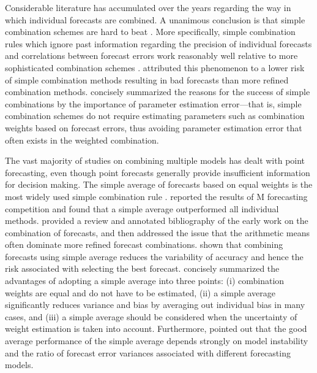 \documentclass[11pt]{article}
\begin{document}
Considerable literature has accumulated over the years regarding the way in which individual forecasts are combined. A unanimous conclusion is that simple combination schemes are hard to beat \citep{Clemen1989-fb,Stock2004-rq,Lichtendahl2020-ut}. More specifically, simple combination rules which ignore past information regarding the precision of individual forecasts and correlations between forecast errors work reasonably well relative to more sophisticated combination schemes \citep[see][]{Clemen1989-fb}. \cite{Lichtendahl2020-ut} attributed this phenomenon to a lower risk of simple combination methods resulting in bad forecasts than more refined combination methods. \cite{Timmermann2006-en} concisely summarized the reasons for the success of simple combinations by the importance of parameter estimation error---that is, simple combination schemes do not require estimating parameters such as combination weights based on forecast errors, thus avoiding parameter estimation error that often exists in the weighted combination.

The vast majority of studies on combining multiple models has dealt with point forecasting, even though point forecasts generally provide insufficient information for decision making. The simple average of forecasts based on equal weights is the most widely used simple combination rule \citep[see][]{Bunn1985-vo,Clemen1986-pd,Stock2003-sp}. \cite{Makridakis1982-hb} reported the results of M forecasting competition and found that a simple average outperformed all individual methods. \cite{Clemen1989-fb} provided a review and annotated bibliography of the early work on the combination of forecasts, and then addressed the issue that the arithmetic means often dominate more refined forecast combinations. \cite{Makridakis1983-hg} shown that combining forecasts using simple average reduces the variability of accuracy and hence the risk associated with selecting the best forecast. \cite{Palm1992-im} concisely summarized the advantages of adopting a simple average into three points: (i) combination weights are equal and do not have to be estimated, (ii) a simple average significantly reduces variance and bias by averaging out individual bias in many cases, and (iii) a simple average should be considered when the uncertainty of weight estimation is taken into account. Furthermore, \cite{Timmermann2006-en} pointed out that the good average performance of the simple average depends strongly on model instability and the ratio of forecast error variances associated with different forecasting models.  
\end{document}
